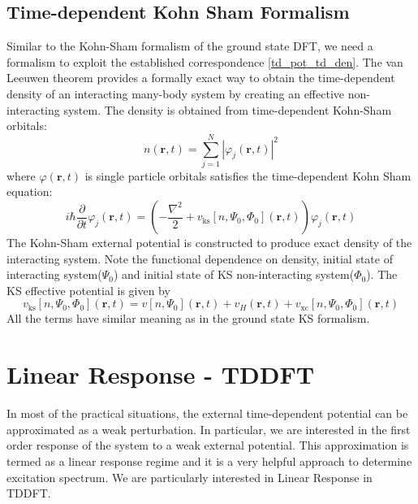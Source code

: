 \subsection{Time-dependent Kohn Sham Formalism}
Similar to the Kohn-Sham formalism of the ground state DFT, we need a formalism to exploit the established correspondence \eqref{td_pot_td_den}. The van Leeuwen theorem provides a formally exact way to obtain the time-dependent density of an interacting many-body system by creating an effective non-interacting system.\cite{ulrich} The density is obtained from time-dependent Kohn-Sham orbitals: 
\begin{equation}\label{td_density_ks}
    n(\mathbf{r},t) = \sum_{j=1}^N|\varphi_j(\mathbf{r},t)|^2
\end{equation}
where $\varphi(\mathbf{r},t)$ is single particle orbitals satisfies the time-dependent Kohn Sham equation:
\begin{equation}\label{td_KS_eqn}
    i\hbar\frac{\partial}{\partial t}\varphi_j(\mathbf{r},t) = \left(-\frac{\nabla^2}{2} + v_{\text{ks}}[n,\Psi_0,\Phi_0](\mathbf{r},t)\right)\varphi_j(\mathbf{r},t)
\end{equation}
The Kohn-Sham external potential is constructed to produce  exact density of the interacting system. Note the functional dependence on density, initial state of interacting system($\Psi_0$) and initial state of KS non-interacting system($\Phi_0$). The KS effective potential is given by
\begin{equation}
    v_{\text{ks}}[n,\Psi_0,\Phi_0](\mathbf{r},t) = v[n,\Psi_0](\mathbf{r},t) + v_H(\mathbf{r},t) + v_{\text{xc}}[n,\Psi_0,\Phi_0](\mathbf{r},t)
\end{equation}
All the terms have similar meaning as in the ground state KS formalism.
\section{Linear Response - TDDFT}

In most of the practical situations, the external time-dependent potential can be approximated as a weak perturbation. In particular, we are interested in the first order response of the system to a weak external potential. This approximation is termed as a linear response regime and it is a very helpful approach to determine excitation spectrum. We are particularly interested in Linear Response in TDDFT.\cite{lrtddft}
